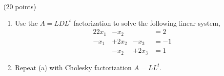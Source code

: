 \documentclass[10pt]{jhwhw}
\begin{document}
\solution

\problem{} (20 points)

	\begin{enumerate}
		\item Use the $A = LDL^t$ factorization to solve the following linear system,
			\begin{alignat*}{2}
				2x_1 &- x_2 & &= 2 \\
				-x_1 &+ 2x_2 &- x_3 &= -1 \\
				&- x_2 &+ 2x_3 &= 1
			\end{alignat*}
		\item Repeat (a) with Cholesky factorization $A = LL^t$.
	\end{enumerate}

\solution
\end{document}
